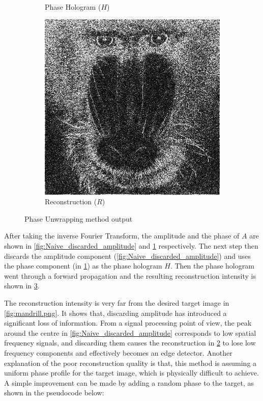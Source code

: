 \begin{figure}[H]
\begin{subfigure}[t]{0.3\textwidth}
    \caption{Phase Hologram ($H$)}
    \label{fig:Naive_output_holo}
  \end{subfigure}
  \hfill
  \begin{subfigure}[t]{0.3\textwidth}
    \centering
    \includegraphics[width=\textwidth]{Naive_output_recon.png}
    \caption{Reconstruction ($R$)}
    \label{fig:Naive_output_recon}
  \end{subfigure}
  \caption{Phase Unwrapping method output}
  \label{fig:Naive algorithm output}
\end{figure}

After taking the inverse Fourier Transform, the amplitude and the phase of $A$ are shown in \cref{fig:Naive_discarded_amplitude} and \cref{fig:Naive_output_holo} respectively. The next step then discards the amplitude component (\cref{fig:Naive_discarded_amplitude}) and uses the phase component (in \cref{fig:Naive_output_holo}) as the phase hologram $H$. Then the phase hologram went through a forward propagation and the resulting reconstruction intensity is shown in \cref{fig:Naive algorithm output}.

The reconstruction intensity is very far from the desired target image in \cref{fig:mandrill.png}. It shows that, discarding amplitude has introduced a significant loss of information. From a signal processing point of view, the peak around the centre in \cref{fig:Naive_discarded_amplitude} corresponds to low spatial frequency signals, and discarding them causes the reconstruction in \cref{fig:Naive_output_recon} to lose low frequency components and effectively becomes an edge detector. Another explanation of the poor reconstruction quality is that, this method is assuming a uniform phase profile for the target image, which is physically difficult to achieve. A simple improvement can be made by adding a random phase to the target, as shown in the pseudocode below:

